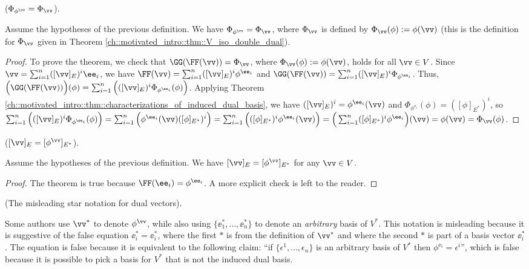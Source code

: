 \begin{theorem}
    \label{ch::motivated_intro::thm::Phiphiv_eq_Phiv}
    ($\Phi_{\phi^\vv} = \Phi_\vv$).

    Assume the hypotheses of the previous definition. We have $\Phi_{\phi^\vv} = \Phi_\vv$, where $\Phi_\vv$ is defined by $\Phi_\vv(\phi) := \phi(\vv)$ (this is the definition for $\Phi_\vv$ given in Theorem \ref{ch::motivated_intro::thm::V_iso_double_dual}).
\end{theorem}

\begin{proof}
    To prove the theorem, we check that $\GG(\FF(\vv)) = \Phi_\vv$, where $\Phi_\vv(\phi) := \phi(\vv)$, holds for all $\vv \in V$. Since $\vv = \sum_{i = 1}^n ([\vv]_E)^i \ee_i$, we have $\FF(\vv) = \sum_{i = 1}^n ([\vv]_E)^i \phi^{\ee_i}$ and $\GG(\FF(\vv)) = \sum_{i = 1}^n ([\vv]_E)^i \Phi_{\phi^{\ee_i}}$. Thus, $\Big(\GG(\FF(\vv))\Big)(\phi) = \sum_{i = 1}^n \Big( ([\vv]_E)^i \Phi_{\phi^{\ee_i}}(\phi) \Big)$. Applying Theorem \ref{ch::motivated_intro::thm::characterizations_of_induced_dual_basis}, we have $([\vv]_E)^i = \phi^{\ee_i}(\vv)$ and $\Phi_{\phi^{\ee_i}}(\phi) = ([\phi]_{E^*})^i$, so \\ ${\sum_{i = 1}^n \Big( ([\vv]_E)^i \Phi_{\phi^{\ee_i}}(\phi) \Big) = \sum_{i = 1}^n \Big( \phi^{\ee_i}(\vv) ([\phi]_{E^*})^i \Big) = \sum_{i = 1}^n \Big( ([\phi]_{E^*})^i \phi^{\ee_i}(\vv) \Big) = \Big(\sum_{i = 1}^n ([\phi]_{E^*})^i \phi^{\ee_i}\Big)(\vv) = \phi(\vv) = \Phi_\vv(\phi)}$.
\end{proof}

\begin{theorem}
    \label{ch::intro_to_tensors::thm:vv_E_eq_phi_vv_Estar}
    
    ($[\vv]_E = [\phi^\vv]_{E^*}$).
    
    Assume the hypotheses of the previous definition. We have $[\vv]_E = [\phi^\vv]_{E^*}$ for any $\vv \in V$.
\end{theorem}

\begin{proof}
    The theorem is true because $\FF(\ee_i) = \phi^{\ee_i}$. A more explicit check is left to the reader.
\end{proof}

\begin{remark}
    (The misleading star notation for dual vectors).
    
    Some authors use $\vv^*$ to denote $\phi^\vv$, while also using $\{\ee_1^*, ..., \ee_n^*\}$ to denote an \textit{arbitrary} basis of $V^*$. This notation is misleading because it is suggestive of the false equation $\ee_i^* = \ee_i^*$, where the first $*$ is from the definition of $\vv^*$ and where the second $*$ is part of a basis vector $\ee_i^*$. The equation is false because it is equivalent to the following claim: ``if $\{\epsilon^1, ..., \epsilon_n\}$ is an arbitrary basis of $V^*$ then $\phi^{\ee_i} = \epsilon^i$'', which is false because it is possible to pick a basis for $V^*$ that is not the induced dual basis.
\end{remark}

